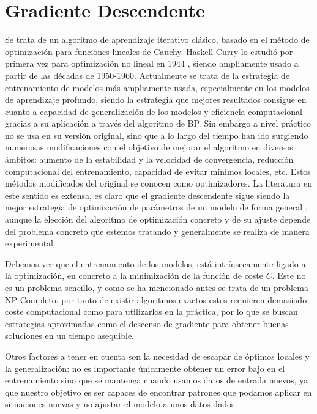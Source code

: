 \section{Gradiente Descendente}

Se trata de un algoritmo de aprendizaje iterativo clásico, basado en el método de optimización para funciones lineales de Cauchy. Haskell Curry lo estudió por primera vez para optimización no lineal en 1944 \cite{Curry1944GDNoLin}, siendo ampliamente usado a partir de las décadas de 1950-1960. Actualmente se trata de la estrategia de entrenamiento de modelos más ampliamente usada, especialmente en los modelos de aprendizaje profundo, siendo la estrategia que mejores resultados consigue en cuanto a capacidad de generalización de los modelos y eficiencia computacional gracias a su aplicación a través del algoritmo de BP. Sin embargo a nivel práctico no se usa en su versión original, sino que a lo largo del tiempo han ido surgiendo numerosas modificaciones con el objetivo de mejorar el algoritmo en diversos ámbitos: aumento de la estabilidad y la velocidad de convergencia, reducción computacional del entrenamiento, capacidad de evitar mínimos locales, etc. Estos métodos modificados del original se conocen como optimizadores. La literatura en este sentido es extensa, es claro que el gradiente descendente sigue siendo la mejor estrategia de optimización de parámetros de un modelo de forma general \cite{MHtrainingClase}, aunque la elección del algoritmo de optimización concreto y de su ajuste depende del problema concreto que estemos tratando y generalmente se realiza de manera experimental. 

Debemos ver que el entrenamiento de los modelos, está intrínsecamente ligado a la optimización, en concreto a la minimización de la función de coste $C$. Este no es un problema sencillo, y como se ha mencionado antes se trata de un problema NP-Completo, por tanto de existir algoritmos exactos estos requieren demasiado coste computacional como para utilizarlos en la práctica, por lo que se buscan estrategias aproximadas como el descenso de gradiente para obtener buenas soluciones en un tiempo asequible. 

Otros factores a tener en cuenta son la necesidad de escapar de óptimos locales y la generalización: no es importante únicamente obtener un error bajo en el entrenamiento sino que se mantenga cuando usamos datos de entrada nuevos, ya que nuestro objetivo es ser capaces de encontrar patrones que podamos aplicar en situaciones nuevas y no ajustar el modelo a unos datos dados.

